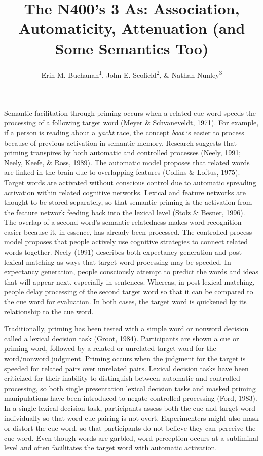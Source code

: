 \documentclass[english,man]{apa6}
\title{The N400's 3 As: Association, Automaticity, Attenuation (and Some
Semantics Too)}
\author{Erin M. Buchanan\textsuperscript{1}, John E. Scofield\textsuperscript{2}, \& Nathan Nunley\textsuperscript{3}}
\affiliation{
    \vspace{0.5cm}
          \textsuperscript{1} Missouri State University\\
          \textsuperscript{2} University of Missouri\\
          \textsuperscript{3} University of Mississippi  }
\theoremstyle{definition}
\theoremstyle{definition}
\theoremstyle{remark}
\begin{document}
\maketitle

\setcounter{secnumdepth}{0}



Semantic facilitation through priming occurs when a related cue word
speeds the processing of a following target word (Meyer \& Schvaneveldt,
1971). For example, if a person is reading about a \emph{yacht} race,
the concept \emph{boat} is easier to process because of previous
activation in semantic memory. Research suggests that priming transpires
by both automatic and controlled processes (Neely, 1991; Neely, Keefe,
\& Ross, 1989). The automatic model proposes that related words are
linked in the brain due to overlapping features (Collins \& Loftus,
1975). Target words are activated without conscious control due to
automatic spreading activation within related cognitive networks.
Lexical and feature networks are thought to be stored separately, so
that semantic priming is the activation from the feature network feeding
back into the lexical level (Stolz \& Besner, 1996). The overlap of a
second word's semantic relatedness makes word recognition easier because
it, in essence, has already been processed. The controlled process model
proposes that people actively use cognitive strategies to connect
related words together. Neely (1991) describes both expectancy
generation and post lexical matching as ways that target word processing
may be speeded. In expectancy generation, people consciously attempt to
predict the words and ideas that will appear next, especially in
sentences. Whereas, in post-lexical matching, people delay processing of
the second target word so that it can be compared to the cue word for
evaluation. In both cases, the target word is quickened by its
relationship to the cue word.

Traditionally, priming has been tested with a simple word or nonword
decision called a lexical decision task (Groot, 1984). Participants are
shown a cue or priming word, followed by a related or unrelated target
word for the word/nonword judgment. Priming occurs when the judgment for
the target is speeded for related pairs over unrelated pairs. Lexical
decision tasks have been criticized for their inability to distinguish
between automatic and controlled processing, so both single presentation
lexical decision tasks and masked priming manipulations have been
introduced to negate controlled processing (Ford, 1983). In a single
lexical decision task, participants assess both the cue and target word
individually so that word-cue pairing is not overt. Experimenters might
also mask or distort the cue word, so that participants do not believe
they can perceive the cue word. Even though words are garbled, word
perception occurs at a subliminal level and often facilitates the target
word with automatic activation.
\end{document}
